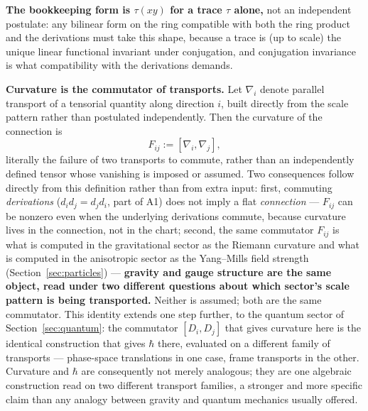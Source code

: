\documentclass[aps,prd,twocolumn,superscriptaddress,nofootinbib]{revtex4-2}
\begin{document}
\textbf{The bookkeeping form is $\tau(xy)$ for a trace $\tau$ alone,} not
an independent postulate: any bilinear form on the ring compatible with
both the ring product and the derivations must take this shape, because a
trace is (up to scale) the unique linear functional invariant under
conjugation, and conjugation invariance is what compatibility with the
derivations demands.

\textbf{Curvature is the commutator of transports.} Let $\nabla_i$ denote
parallel transport of a tensorial quantity along direction $i$, built
directly from the scale pattern rather than postulated independently.
Then the curvature of the connection is
\begin{equation}
F_{ij} := [\nabla_i, \nabla_j],
\end{equation}
literally the failure of two transports to commute, rather than an
independently defined tensor whose vanishing is imposed or assumed. Two
consequences follow directly from this definition rather than from extra
input: first, commuting \emph{derivations} ($d_id_j = d_jd_i$, part of
A1) does not imply a flat \emph{connection} — $F_{ij}$ can be nonzero
even when the underlying derivations commute, because curvature lives in
the connection, not in the chart; second, the same commutator $F_{ij}$ is
what is computed in the gravitational sector as the Riemann curvature and
what is computed in the anisotropic sector as the Yang–Mills field
strength (Section~\ref{sec:particles}) — \textbf{gravity and gauge
structure are the same object, read under two different questions about
which sector's scale pattern is being transported.} Neither is assumed;
both are the same commutator. This identity extends one step further,
to the quantum sector of Section~\ref{sec:quantum}: the commutator
$[D_i,D_j]$ that gives curvature here is the identical construction
that gives $\hbar$ there, evaluated on a different family of
transports — phase-space translations in one case, frame transports in
the other. Curvature and $\hbar$ are consequently not merely analogous;
they are one algebraic construction read on two different transport
families, a stronger and more specific claim than any analogy between
gravity and quantum mechanics usually offered.
\end{document}
